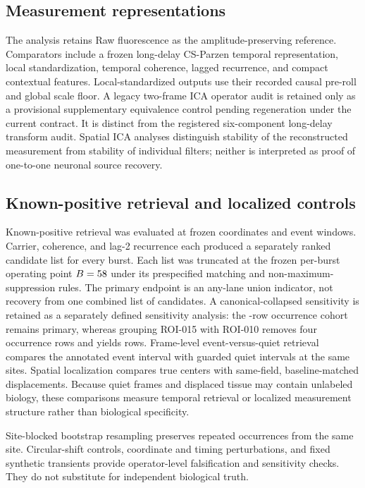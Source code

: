 \subsection{Measurement representations}

The analysis retains Raw fluorescence as the amplitude-preserving reference.
Comparators include a frozen long-delay CS-Parzen temporal representation, local
standardization, temporal coherence, lagged recurrence, and compact contextual
features. Local-standardized outputs use their recorded causal pre-roll and
global scale floor. A legacy two-frame ICA operator audit is retained only as a
provisional supplementary equivalence control pending regeneration under the
current contract. It is distinct from the registered six-component long-delay
transform audit. Spatial ICA analyses distinguish stability of the
reconstructed measurement from stability of individual filters; neither is
interpreted as proof of one-to-one neuronal source recovery.

\subsection{Known-positive retrieval and localized controls}

Known-positive retrieval was evaluated at frozen coordinates and event windows.
Carrier, coherence, and lag-2 recurrence each produced a separately ranked
candidate list for every burst. Each list was truncated at the frozen per-burst
operating point \(B=58\) under its prespecified matching and
non-maximum-suppression rules. The primary endpoint is an any-lane union
indicator, not recovery from one combined list of \VenuePerLaneBudget{}
candidates. A canonical-collapsed sensitivity is retained as a separately
defined sensitivity analysis: the \VenueCohortOccurrences{}-row occurrence
cohort remains primary, whereas grouping ROI-015 with ROI-010 removes four
occurrence rows and yields \VenueCanonicalOccurrences{} rows. Frame-level
event-versus-quiet retrieval compares the annotated event interval with guarded
quiet intervals at the same sites.
Spatial localization compares true centers with same-field, baseline-matched
displacements. Because quiet frames and displaced tissue may contain unlabeled
biology, these comparisons measure temporal retrieval or localized measurement
structure rather than biological specificity.

Site-blocked bootstrap resampling preserves repeated occurrences from the same
site. Circular-shift controls, coordinate and timing perturbations, and fixed
synthetic transients provide operator-level falsification and sensitivity
checks. They do not substitute for independent biological truth.

